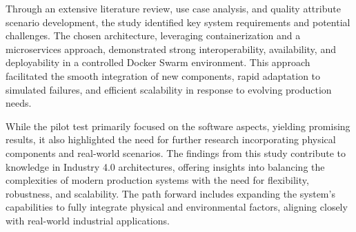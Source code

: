 \documentclass[conference]{IEEEtran}
\begin{document}
Through an extensive literature review, use case analysis, and quality attribute scenario development, the study identified key system requirements and potential challenges. The chosen architecture, leveraging containerization and a microservices approach, demonstrated strong interoperability, availability, and deployability in a controlled Docker Swarm environment. This approach facilitated the smooth integration of new components, rapid adaptation to simulated failures, and efficient scalability in response to evolving production needs.

While the pilot test primarily focused on the software aspects, yielding promising results, it also highlighted the need for further research incorporating physical components and real-world scenarios. The findings from this study contribute to knowledge in Industry 4.0 architectures, offering insights into balancing the complexities of modern production systems with the need for flexibility, robustness, and scalability. The path forward includes expanding the system's capabilities to fully integrate physical and environmental factors, aligning closely with real-world industrial applications.





\newpage


\vspace{12pt}
\end{document}

